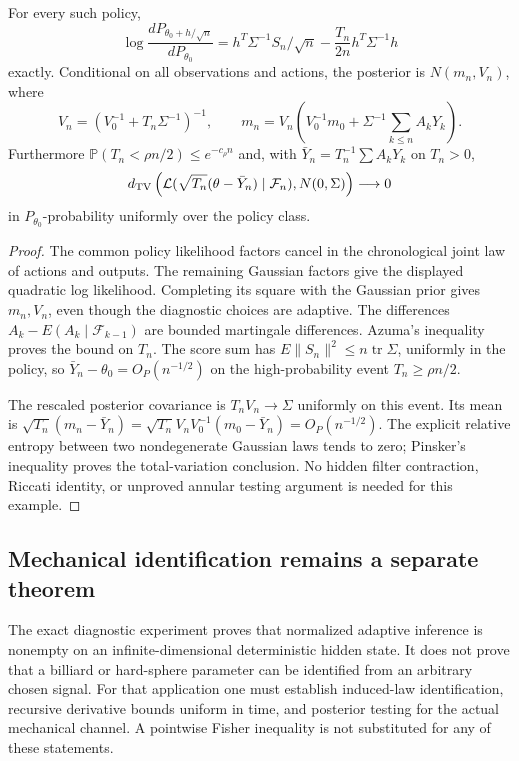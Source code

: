 \begin{theorem}
\label{thm:r33-c1-exact}
For every such policy,
\[
 \log\frac{dP_{\theta_0+h/\sqrt n}}{dP_{\theta_0}}
 =h^T\Sigma^{-1}S_n/\sqrt n
   -\frac{T_n}{2n}h^T\Sigma^{-1}h
\]
exactly.  Conditional on all observations and actions, the posterior is
$N(m_n,V_n)$, where
\[
 V_n=(V_0^{-1}+T_n\Sigma^{-1})^{-1},\qquad
 m_n=V_n\left(V_0^{-1}m_0+
            \Sigma^{-1}\sum_{k\le n}A_kY_k\right).
\]
Furthermore $\mathbb P(T_n<\rho n/2)\le e^{-c_\rho n}$ and, with
$\bar Y_n=T_n^{-1}\sum A_kY_k$ on $T_n>0$,
\[
 d_{\rm TV}\left(
 \mathcal L(\sqrt{T_n}(\theta-\bar Y_n)\mid\mathcal F_n),
 N(0,\Sigma)\right)\longrightarrow0
\]
in $P_{\theta_0}$-probability uniformly over the policy class.
\end{theorem}
\begin{proof}
The common policy likelihood factors cancel in the chronological joint law
of actions and outputs.  The remaining Gaussian factors give the displayed
quadratic log likelihood.  Completing its square with the Gaussian prior
gives $m_n,V_n$, even though the diagnostic choices are adaptive.
The differences $A_k-E(A_k\mid\mathcal F_{k-1})$ are bounded martingale
differences.  Azuma's inequality proves the bound on $T_n$.
The score sum has $E\|S_n\|^2\le n\operatorname{tr}\Sigma$, uniformly in
the policy, so $\bar Y_n-\theta_0=O_P(n^{-1/2})$ on the high-probability
event $T_n\ge\rho n/2$.

The rescaled posterior covariance is $T_nV_n\to\Sigma$ uniformly on this
event.  Its mean is
$\sqrt{T_n}(m_n-\bar Y_n)
 =\sqrt{T_n}V_nV_0^{-1}(m_0-\bar Y_n)=O_P(n^{-1/2})$.
The explicit relative entropy between two nondegenerate Gaussian laws tends
to zero; Pinsker's inequality proves the total-variation conclusion.
No hidden filter contraction, Riccati identity, or unproved annular testing
argument is needed for this example.
\end{proof}

\subsection{Mechanical identification remains a separate theorem}

The exact diagnostic experiment proves that normalized adaptive inference is
nonempty on an infinite-dimensional deterministic hidden state.  It does not
prove that a billiard or hard-sphere parameter can be identified from an
arbitrary chosen signal.  For that application one must establish induced-law
identification, recursive derivative bounds uniform in time, and posterior
testing for the actual mechanical channel.  A pointwise Fisher inequality is
not substituted for any of these statements.
